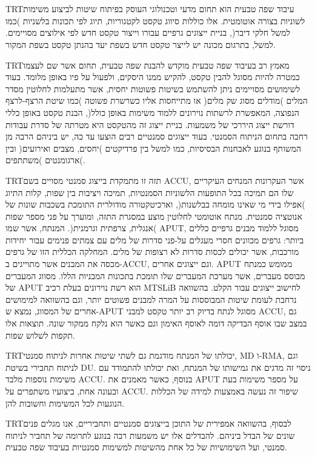 \documentclass[12pt,a4paper]{report}
\newcommand{\heb}[1]{\bgroup\textdir TRT\hebfont #1\egroup}
\begin{document}



\pagebreak

\section*{\flushright{\heb{תקציר}}}

\begin{flushright}
\heb{עיבוד שפה טבעית הוא תחום מדעי וטכנולוגי העוסק בפיתוח שיטות לביצוע משימות לשוניות בצורה אוטומטית.
אלו כוללות סיווג טקסט לקטגוריות, תיוג לפי תכונות בלשניות )כמו למשל חלקי דיבר(,
בניית ייצוגים גרפיים עבורו וייצור טקסט חדש לפי אילוצים מסויימים.
למשל, בתרגום מכונה יש לייצר טקסט חדש בשפת יעד בהנתן טקסט בשפת המקור.}

\heb{מאמץ רב בעיבוד שפה טבעית מוקדש להבנת שפה טבעית, תחום אשר שם לעצמו כמטרה להיות מסוגל להבין טקסט,
להקיש ממנו היסקים, ולפעול על פיו באופן מלומד. בעוד לשימושים מסויימים ניתן להשתמש בשיטות פשוטות יחסית,
אשר מתעלמות לחלוטין מסדר המלים )מודלים מסוג שק מלים( או מתייחסות אליו כשרשרת פשוטה
)כמו שיטת הרצף-לרצף הנפוצה, המאפשרת לרשתות נוירונים ללמוד משימות באופן כולל(, הבנת טקסט באופן כללי דורשת
ייצוג היררכי של משמעות. בניית ייצוג זה מהטקסט היא מטרתה של סדרת עבודות רחבה בתחום הניתוח הסמנטי.
בעוד ייצוגים סמנטיים רבים הוצעו עד כה, יש ביניהם הרבה מן המשותף בנוגע לאבחנות הבסיסיות, כמו למשל בין
פרדיקטים )יחסים, מצבים ואירועים( ובין ארגומנטים )משתתפים(.}

\heb{תזה זו מתמקדת בייצוג סמנטי מסויים בשם ACCU, אשר העקרונות המנחים העיקריים שלו הם
תמיכה בכל התופעות הלשוניות הסמנטיות, תמיכה ויציבות בין שפות, קלות התיוג )אפילו בידי מי שאינו מומחה בבלשנות(,
וארכיטקטורה מודולרית התומכת בשכבות שונות של אנוטציה סמנטית.
מנתח אוטומטי לחלוטין מוצע במסגרת התזה, ומוערך על פני מספר שפות )אנגלית, צרפתית וגרמנית(.
המנתח, אשר שמו APUT, מסוגל ללמוד מבנים גרפיים כללים ביותר: גרפים מכוונים חסרי מעגלים על-פני
סדרות של מלים עם צמתים פנימים עבור יחידות מורכבות, אשר יכולים לכסות סדרות לא רצופות של מלים.
המחלקה הכללית הזו של גרפים מכסה את המבנים אשר מתוייגים ב-ACCU, וגם ייצוגים אחרים.
APUT ממומש כמנתח מבוסס מעברים, אשר מערכת המעברים שלו תומכת בתכונות המבניות הללו.
מסווג המעברים של APUT הוא רשת נוירונים בעלת רכיב MTSLiB לחישוב ייצוגים עבור הקלט.
בהשוואה נרחבת לעומת שיטות המבוססות על המרה למבנים פשוטים יותר, וגם בהשוואה למימושים אחרים של המסווג,
נמצא ש-APUT מסוגל לנתח בדיוק רב יותר טקסט למבני ACCU, גם במצב שבו אוסף הבדיקה דומה לאוסף האימון
וגם כאשר הוא נלקח ממקור שונה. תוצאות אלו תקפות לשלוש שפות.}

\heb{יכולתו של המנתח מודגמת גם לשתי שיטות אחרות לניתוח סמנטי, MD ו-RMA,
וגם לניתוח תחבירי בשיטת DU. ניסוי זה מדגים את גמישותו של המנתח, ואת יכולתו להתמודד
עם משימות נוספות מלבד ACCU. בנוסף, כאשר מאמנים את APUT על מספר משימות בעת ובעונה אחת,
ביצועיו משתפרים על ACCU. שיפור זה נעשה באמצעות למידה של הכללות הנוגעות לכל המשימות וחשובות להן.}

\heb{לבסוף, בהשוואה אמפירית של התוכן בייצוגים סמנטיים ותחביריים, אנו מגלים פנים שונים של הבדל ביניהם.
להבדלים אלו יש משמעות רבה בנוגע לתרומה של תחביר לניתוח סמנטי, ועל השימושיות של כל אחת מהשיטות למשימות
סמנטיות בעיבוד שפה טבעית.}
\end{flushright}
\end{document}

